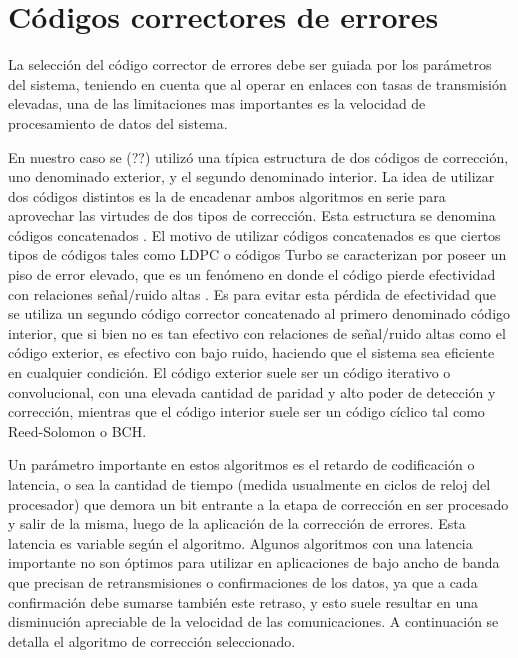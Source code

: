 \section{Códigos correctores de errores}

La selección del código corrector de errores debe ser guiada por los parámetros del sistema, teniendo en cuenta que al operar en enlaces con tasas de transmisión elevadas, una de las limitaciones mas importantes es la velocidad de procesamiento de datos del sistema.

En nuestro caso se (??) utilizó una típica estructura de dos códigos de corrección, uno denominado exterior, y el segundo denominado interior.
La idea de utilizar dos códigos distintos es la de encadenar ambos algoritmos en serie para aprovechar las virtudes de dos tipos de corrección. Esta estructura se denomina códigos concatenados \cite{forney1966concatenated}. El motivo de utilizar códigos concatenados es que ciertos tipos de códigos tales como LDPC o códigos Turbo se caracterizan por poseer un piso de error elevado, que es un fenómeno en donde el código pierde efectividad con relaciones señal/ruido altas \cite{Moon:05}. Es para evitar esta pérdida de efectividad que se utiliza un segundo código corrector concatenado al primero denominado código interior, que si bien no es tan efectivo con relaciones de señal/ruido altas como el código exterior, es efectivo con bajo ruido, haciendo que el sistema sea eficiente en cualquier condición. El código exterior suele ser un código iterativo o convolucional, con una elevada cantidad de paridad y alto poder de detección y corrección, mientras que el código interior suele ser un código cíclico tal como Reed-Solomon o BCH.

Un parámetro importante en estos algoritmos es el retardo de codificación o latencia, o sea la cantidad de tiempo (medida usualmente en ciclos de reloj del procesador) que demora un bit entrante a la etapa de corrección en ser procesado y salir de la misma, luego de la aplicación de la corrección de errores. Esta latencia es variable según el algoritmo. Algunos algoritmos con una latencia importante no son óptimos para utilizar en aplicaciones de bajo ancho de banda que precisan de retransmisiones o confirmaciones de los datos, ya que a cada confirmación debe sumarse también este retraso, y esto suele resultar en una disminución apreciable de la velocidad de las comunicaciones. A continuación se detalla el algoritmo de corrección seleccionado.

